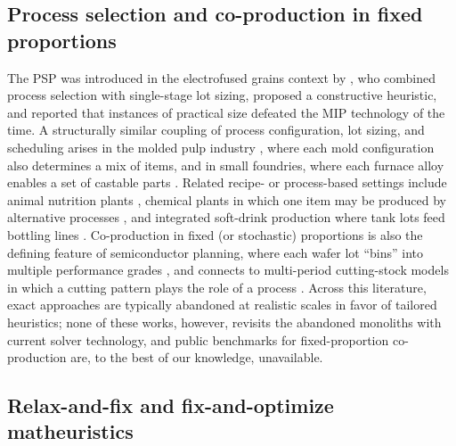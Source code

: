 \subsection{Process selection and co-production in fixed proportions}
\label{sec:rw-coproduction}

The PSP was introduced in the electrofused grains context by
\citet{luche2009combining}, who combined process selection with
single-stage lot sizing, proposed a constructive heuristic, and
reported that instances of practical size defeated the MIP technology
of the time. A structurally similar coupling of process configuration,
lot sizing, and scheduling arises in the molded pulp industry
\citep{martinez2018coupled}, where each mold configuration also
determines a mix of items, and in small foundries, where each furnace
alloy enables a set of castable parts \citep{araujo2008foundry}.
Related recipe- or process-based settings include animal nutrition
plants \citep{toso2009lot,clark2010production}, chemical plants in
which one item may be produced by alternative processes
\citep{villasboas2021modeling}, and integrated soft-drink production
where tank lots feed bottling lines
\citep{ferreira2009solution,toledo2015sitlsp}. Co-production in fixed
(or stochastic) proportions is also the defining feature of
semiconductor planning, where each wafer lot ``bins'' into multiple
performance grades \citep{leachman2002semiconductor,ng2007robust},
and connects to multi-period cutting-stock models in which a cutting
pattern plays the role of a process \citep{silva2023formulations}.
Across this literature, exact approaches are typically abandoned at
realistic scales in favor of tailored heuristics; none of these works,
however, revisits the abandoned monoliths with current solver
technology, and public benchmarks for fixed-proportion co-production
are, to the best of our knowledge, unavailable.

\subsection{Relax-and-fix and fix-and-optimize matheuristics}
\label{sec:rw-matheuristics}

